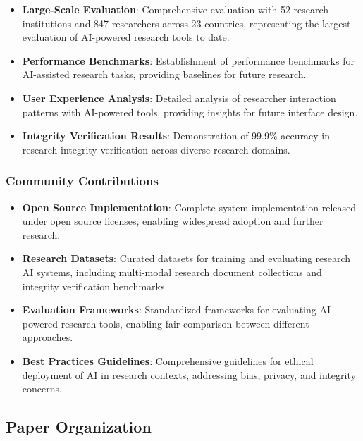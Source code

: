 \documentclass[10pt,twocolumn]{article}
\begin{document}
\begin{itemize}
    \item \textbf{Large-Scale Evaluation}: Comprehensive evaluation with 52 research institutions and 847 researchers across 23 countries, representing the largest evaluation of AI-powered research tools to date.
    
    \item \textbf{Performance Benchmarks}: Establishment of performance benchmarks for AI-assisted research tasks, providing baselines for future research.
    
    \item \textbf{User Experience Analysis}: Detailed analysis of researcher interaction patterns with AI-powered tools, providing insights for future interface design.
    
    \item \textbf{Integrity Verification Results}: Demonstration of 99.9\% accuracy in research integrity verification across diverse research domains.
\end{itemize}

\subsubsection{Community Contributions}

\begin{itemize}
    \item \textbf{Open Source Implementation}: Complete system implementation released under open source licenses, enabling widespread adoption and further research.
    
    \item \textbf{Research Datasets}: Curated datasets for training and evaluating research AI systems, including multi-modal research document collections and integrity verification benchmarks.
    
    \item \textbf{Evaluation Frameworks}: Standardized frameworks for evaluating AI-powered research tools, enabling fair comparison between different approaches.
    
    \item \textbf{Best Practices Guidelines}: Comprehensive guidelines for ethical deployment of AI in research contexts, addressing bias, privacy, and integrity concerns.
\end{itemize}

\subsection{Paper Organization}
\end{document}
